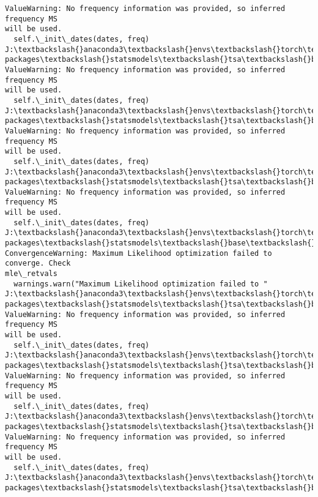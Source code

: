 \documentclass[11pt]{article}
\begin{document}
\begin{Verbatim}[commandchars=\\\{\}]
ValueWarning: No frequency information was provided, so inferred frequency MS
will be used.
  self.\_init\_dates(dates, freq)
J:\textbackslash{}anaconda3\textbackslash{}envs\textbackslash{}torch\textbackslash{}Lib\textbackslash{}site-packages\textbackslash{}statsmodels\textbackslash{}tsa\textbackslash{}base\textbackslash{}tsa\_model.py:473:
ValueWarning: No frequency information was provided, so inferred frequency MS
will be used.
  self.\_init\_dates(dates, freq)
J:\textbackslash{}anaconda3\textbackslash{}envs\textbackslash{}torch\textbackslash{}Lib\textbackslash{}site-packages\textbackslash{}statsmodels\textbackslash{}tsa\textbackslash{}base\textbackslash{}tsa\_model.py:473:
ValueWarning: No frequency information was provided, so inferred frequency MS
will be used.
  self.\_init\_dates(dates, freq)
J:\textbackslash{}anaconda3\textbackslash{}envs\textbackslash{}torch\textbackslash{}Lib\textbackslash{}site-packages\textbackslash{}statsmodels\textbackslash{}tsa\textbackslash{}base\textbackslash{}tsa\_model.py:473:
ValueWarning: No frequency information was provided, so inferred frequency MS
will be used.
  self.\_init\_dates(dates, freq)
J:\textbackslash{}anaconda3\textbackslash{}envs\textbackslash{}torch\textbackslash{}Lib\textbackslash{}site-packages\textbackslash{}statsmodels\textbackslash{}base\textbackslash{}model.py:607:
ConvergenceWarning: Maximum Likelihood optimization failed to converge. Check
mle\_retvals
  warnings.warn("Maximum Likelihood optimization failed to "
J:\textbackslash{}anaconda3\textbackslash{}envs\textbackslash{}torch\textbackslash{}Lib\textbackslash{}site-packages\textbackslash{}statsmodels\textbackslash{}tsa\textbackslash{}base\textbackslash{}tsa\_model.py:473:
ValueWarning: No frequency information was provided, so inferred frequency MS
will be used.
  self.\_init\_dates(dates, freq)
J:\textbackslash{}anaconda3\textbackslash{}envs\textbackslash{}torch\textbackslash{}Lib\textbackslash{}site-packages\textbackslash{}statsmodels\textbackslash{}tsa\textbackslash{}base\textbackslash{}tsa\_model.py:473:
ValueWarning: No frequency information was provided, so inferred frequency MS
will be used.
  self.\_init\_dates(dates, freq)
J:\textbackslash{}anaconda3\textbackslash{}envs\textbackslash{}torch\textbackslash{}Lib\textbackslash{}site-packages\textbackslash{}statsmodels\textbackslash{}tsa\textbackslash{}base\textbackslash{}tsa\_model.py:473:
ValueWarning: No frequency information was provided, so inferred frequency MS
will be used.
  self.\_init\_dates(dates, freq)
J:\textbackslash{}anaconda3\textbackslash{}envs\textbackslash{}torch\textbackslash{}Lib\textbackslash{}site-packages\textbackslash{}statsmodels\textbackslash{}tsa\textbackslash{}base\textbackslash{}tsa\_model.py:473:

\end{Verbatim}
\end{document}
